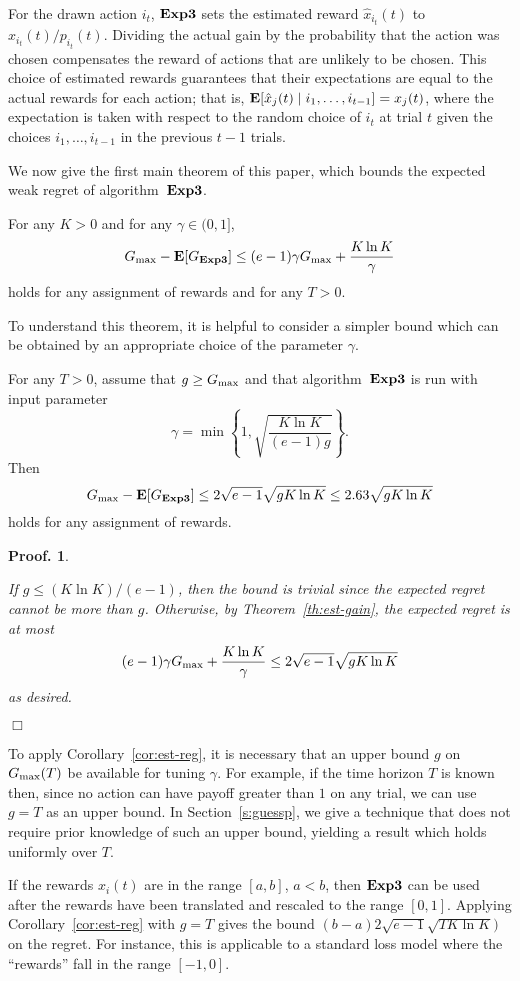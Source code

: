\documentclass[12pt]{article}
\newcommand{\E}{\mbox{\rm\bf E}}
\newcommand{\Aest}{{\bf Exp3}}
\newcommand{\braces}[1]{\left\{{#1}\right\}}
\newcommand{\x}[2]{x_{#1}({#2})}
\renewcommand{\i}[1]{i_{#1}}
\newcommand{\xit}{\x{\i{t}}{t}}
\newcommand{\Gbest}{G_{\rm max}}
\newcommand{\p}[2]{p_{#1}(#2)}
\newcommand{\hx}[2]{\hat{x}_{#1}(#2)}
\newcommand{\hxit}{\hx{\i{t}}{t}}
\newcommand{\pit}{\p{\i{t}}{t}}
\newtheorem{pproof}{Proof.}
\newenvironment{proof}{
\begin{pproof}
        \begin{rm}\begin{rm}}{
        \hspace*{\fill} $\Box$
        \end{rm}\end{rm}
        \end{pproof}
}
\begin{document}
For the drawn action $\i{t}$, $\Aest$ sets the estimated reward $\hxit$ to
$\xit/\pit$. Dividing the actual gain by the probability that the action
was chosen compensates the reward of actions that are unlikely to be chosen.
This choice of estimated rewards guarantees that their expectations are
equal to the actual rewards for each action; that is,
$\E[\hx{j}{t} \mid \i{1},\ldots,\i{t-1}] = \x{j}{t}$,
where the expectation is taken with respect to the random choice of $i_t$ at trial
$t$ given the choices $\i{1},\ldots,\i{t-1}$ in the previous $t-1$ trials.

We now give the first main theorem of this paper, which bounds the expected
weak regret of algorithm~$\Aest$.
%
\begin{theorem}
\label{th:est-gain}
For any $K > 0$ and for any $\gamma\in(0,1]$,
\[
    \Gbest-\E[G_{\Aest}]
\leq
    (e-1)\gamma\Gbest + \frac{K\ln K}{\gamma}
\]
holds for any assignment of rewards and for any $T > 0$.
\end{theorem}
%
To understand this theorem, it is helpful to consider a simpler bound
which can be obtained by an appropriate choice of the parameter $\gamma$.
%
\begin{cor}
\label{cor:est-reg}
For any $T > 0$, assume that $g \geq \Gbest$ and that algorithm~$\Aest$
is run with input parameter 
\[
        \gamma = \min\braces{1,\sqrt{\frac{K\ln K}{(e-1)g}}}.
\]
Then
\[
        \Gbest-\E[G_{\Aest}]
\leq
        2\sqrt{e-1} \sqrt{g K \ln K} \leq 2.63 \sqrt{g K \ln K}
\]
holds for any assignment of rewards.
\end{cor}
%
\begin{proof}
If $g\leq (K\ln K)/(e-1)$, then the bound is trivial since the
expected regret cannot be more than $g$.
Otherwise, by Theorem~\ref{th:est-gain}, the expected regret is at most
\[
    (e-1)\gamma\Gbest + \frac{K\ln K}{\gamma}
\le
        2\sqrt{e-1} \sqrt{g K \ln K}
\]
as desired.
\end{proof}
%
To apply Corollary~\ref{cor:est-reg}, it is necessary that an upper
bound $g$ on $\Gbest(T)$ be available for tuning $\gamma$.
For example, if the time horizon $T$ is known then, 
since no action can have payoff greater than $1$ on any trial, we can
use $g=T$ as an upper bound.
In Section~\ref{s:guessp}, we give a technique that does not require
prior knowledge of such an upper bound, yielding a result which holds
uniformly over $T$.

If the rewards $\x{i}{t}$ are in the range $[a,b]$, $a<b$, then $\Aest$
can be used after the rewards have been translated and rescaled to the
range $[0,1]$.
Applying Corollary~\ref{cor:est-reg} with $g=T$ gives the bound
$(b-a)2\sqrt{e-1}\sqrt{T K \ln K})$ on the regret.
For instance, this is applicable to a standard loss model where the
``rewards'' fall in the range $[-1,0]$.
\end{document}
